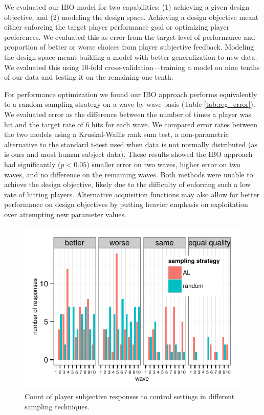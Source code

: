 \documentclass[letterpaper]{article}
\begin{document}

We evaluated our IBO model for two capabilities: (1) achieving a given design objective, and (2) modeling the design space. Achieving a design objective meant either enforcing the target player performance goal or optimizing player preferences. We evaluated this as error from the target level of performance and proportion of better or worse choices from player subjective feedback. Modeling the design space meant building a model with better generalization to new data. We evaluated this using 10-fold cross-validation---training a model on nine tenths of our data and testing it on the remaining one tenth.

For performance optimization we found our IBO approach performs equivalently to a random sampling strategy on a wave-by-wave basis (Table \ref{tab:reg_error}). We evaluated error as the difference between the number of times a player was hit and the target rate of 6 hits for each wave. We compared error rates between the two models using a Kruskal-Wallis rank sum test, a non-parametric alternative to the standard t-test used when data is not normally distributed (as is ours and most human subject data). These results showed the IBO approach had significantly ($p<0.05$) smaller error on two waves, higher error on two waves, and no difference on the remaining waves. Both methods were unable to achieve the design objective, likely due to the difficulty of enforcing such a low rate of hitting players. Alternative acquisition functions may also allow for better performance on design objectives by putting heavier emphasis on exploitation over attempting new parameter values.


\begin{figure}[tbph]
\centering
\includegraphics[width=\linewidth]{pref_choice}
\caption{Count of player subjective responses to control settings in different sampling techniques.}
\label{fig:pref_choice}
\end{figure}
\end{document}
